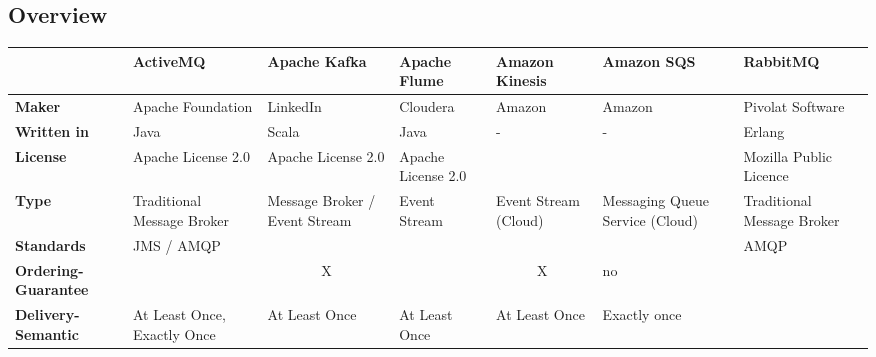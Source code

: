 \begin{landscape}
\section{Overview}

\begin{table}[h]
    \begin{tabular}{|p{3cm}|p{3cm}|p{3cm}|p{3cm}|p{3cm}|p{3cm}|p{3cm}|}
        \hline
                                  & \textbf{ActiveMQ}                     & {\textbf{Apache Kafka}}         & \textbf{Apache Flume}  & \textbf{Amazon Kinesis} & \textbf{Amazon SQS}                                     & \textbf{RabbitMQ}          \\ \hline
        \textbf{Maker}                     & Apache Foundation            &LinkedIn                      & Cloudera               & Amazon                  & Amazon                                                  & Pivolat Software           \\ \hline
        \textbf{Written in}                & Java                         & Scala                         & Java                   & -                       & -                                                       & Erlang                     \\ \hline
        \textbf{License}                   & Apache License 2.0           & Apache License 2.0            & Apache License 2.0     &                         &                                                         & Mozilla Public Licence     \\ \hline
        \textbf{Type}                      & Traditional Message Broker   & Message Broker / Event Stream & Event Stream           & Event Stream (Cloud)    & Messaging Queue Service (Cloud)                         & Traditional Message Broker \\ \hline
        \textbf{Standards            }     & JMS / AMQP                   &                               &                        &                         &                                                         & AMQP                       \\ \hline
        \textbf{Ordering-Guarantee}        &                              &     \multicolumn{1}{c|}{X}     &                        & \multicolumn{1}{c|}{X}  & no                                                      &                            \\ \hline
        \textbf{Delivery-Semantic}         & At Least Once, Exactly Once  & At Least Once                 & At Least Once          & At Least Once           & Exactly once                                            &                            \\ \hline

\end{tabular}
\end{table}
\end{landscape}
